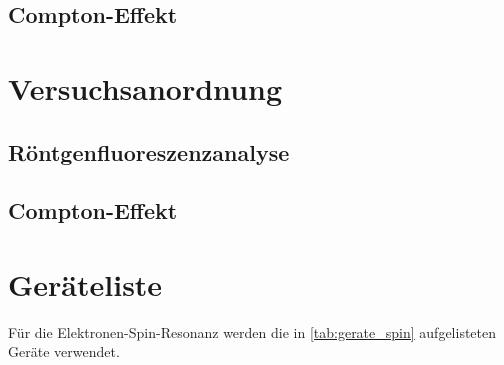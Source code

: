 \documentclass[12pt,english,ngerman]{scrartcl}
\begin{document}
\subsection{Compton-Effekt}


\section{Versuchsanordnung}\label{sec:versuchsanordnung}

\subsection{Röntgenfluoreszenzanalyse}


\subsection{Compton-Effekt}

\section{Geräteliste}\label{sec:geraeteliste}

Für die Elektronen-Spin-Resonanz werden die in \autoref{tab:gerate_spin} aufgelisteten
Geräte verwendet.
\end{document}
